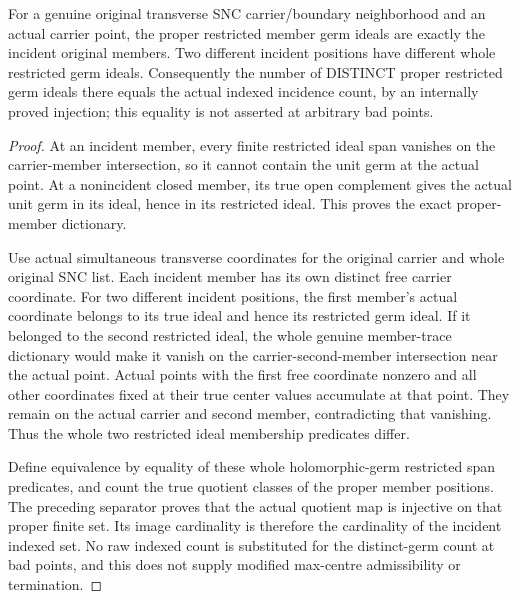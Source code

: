 \begin{lemma}
\label{hir:sharp-original-multiboundary-distinct-proper-trace-germs}
\leanok
For a genuine original transverse SNC carrier/boundary neighborhood and
an actual carrier point, the proper restricted member germ ideals are
exactly the incident original members. Two different incident positions
have different whole restricted germ ideals. Consequently the number
of DISTINCT proper restricted germ ideals there equals the actual
indexed incidence count, by an internally proved injection; this equality
is not asserted at arbitrary bad points.
\end{lemma}
\begin{proof}
At an incident member, every finite restricted ideal span vanishes on
the carrier-member intersection, so it cannot contain the unit germ at
the actual point. At a nonincident closed member, its true open complement
gives the actual unit germ in its ideal, hence in its restricted ideal.
This proves the exact proper-member dictionary.

Use actual simultaneous transverse coordinates for the original carrier
and whole original SNC list. Each incident member has its own distinct
free carrier coordinate. For two different incident positions, the first
member's actual coordinate belongs to its true ideal and hence its
restricted germ ideal. If it belonged to the second restricted ideal,
the whole genuine member-trace dictionary would make it vanish on the
carrier-second-member intersection near the actual point. Actual points
with the first free coordinate nonzero and all other coordinates fixed
at their true center values accumulate at that point. They remain on
the actual carrier and second member, contradicting that vanishing.
Thus the whole two restricted ideal membership predicates differ.

Define equivalence by equality of these whole holomorphic-germ restricted
span predicates, and count the true quotient classes of the proper
member positions. The preceding separator proves that the actual
quotient map is injective on that proper finite set. Its image cardinality
is therefore the cardinality of the incident indexed set. No raw indexed
count is substituted for the distinct-germ count at bad points, and
this does not supply modified max-centre admissibility or termination.
\end{proof}

